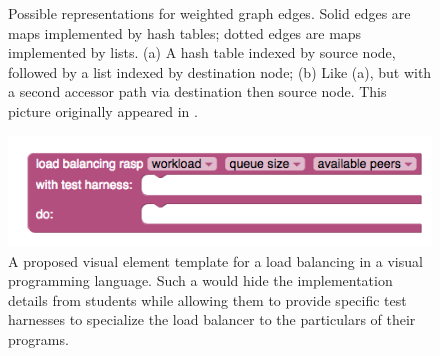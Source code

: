 \begin{figure}[h]
\begin{minipage}{.45\textwidth}
\begin{tikzpicture}[style=g,node distance=0.8cm]
    \end{tikzpicture}
    \caption{Possible representations for weighted graph edges.  Solid edges
      are maps implemented by hash tables; dotted edges are maps implemented
      by lists.  (a) A hash table
      indexed by source node, followed by a list indexed by destination node;
      (b) Like (a), but with a second accessor path via destination then
      source node.
      This picture originally appeared in \cite{data-rep-synth}.}
    \label{fig:rep-synth}
  \end{minipage}%
  \hfill{}
  \begin{minipage}{.45\textwidth}
    \centering
    \includegraphics[width=\textwidth]{rasp}
    \caption{\label{fig:rasp}A proposed visual element template for a load
      balancing \rasp in a visual programming language.  Such a \rasp
      would hide the implementation details from students while allowing them
      to provide specific test harnesses to specialize the load balancer
      to the particulars of their programs.}
  \end{minipage}
  \hfill{}
  
\end{figure}


